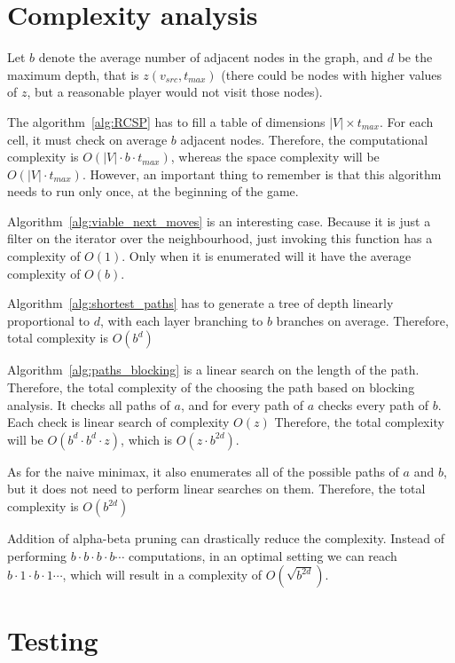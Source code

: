 \documentclass[12pt]{article}
\begin{document}
\clearpage
\section{Complexity analysis}

Let $b$ denote the average number of adjacent nodes in the graph,
and $d$ be the maximum depth, that is $z(v_{src},t_{max})$ (there could be nodes with higher values of $z$, but a reasonable player would not visit those nodes).

The algorithm~\ref*{alg:RCSP} has to fill a table of dimensions $|V| \times t_{max}$.
For each cell, it must check on average $b$ adjacent nodes.
Therefore, the computational complexity is $O(|V| \cdot b \cdot t_{max})$, whereas the space complexity will be $O(|V| \cdot t_{max})$.
However, an important thing to remember is that this algorithm needs to run only once, at the beginning of the game.

Algorithm~\ref{alg:viable_next_moves} is an interesting case.
Because it is just a filter on the iterator over the neighbourhood, just invoking this function has a complexity of $O(1)$.
Only when it is enumerated will it have the average complexity of $O(b)$.

Algorithm~\ref{alg:shortest_paths} has to generate a
tree of depth linearly proportional to $d$,
with each layer branching to $b$ branches on average.
Therefore, total complexity is $O(b^d)$

Algorithm~\ref{alg:paths_blocking} is a linear search on the length of the path.
Therefore, the total complexity of the choosing the path based on blocking analysis.
It checks all paths of $a$, and for every path of $a$ checks every path of $b$.
Each check is linear search of complexity $O(z)$
Therefore, the total complexity will be $O(b^d \cdot b^d \cdot z)$, which is $O(z \cdot b^{2d})$.

As for the naive minimax, it also enumerates all of the possible paths of $a$ and $b$,
but it does not need to perform linear searches on them.
Therefore, the total complexity is $O(b^{2d})$

Addition of alpha-beta pruning can drastically reduce the complexity.
Instead of performing $b \cdot b \cdot b \cdot b \cdots$ computations,
in an optimal setting we can reach $b \cdot 1 \cdot b \cdot 1 \cdots$, which will result in a complexity of $O(\sqrt{b^{2d}})$.

\clearpage
\section{Testing}
\end{document}
